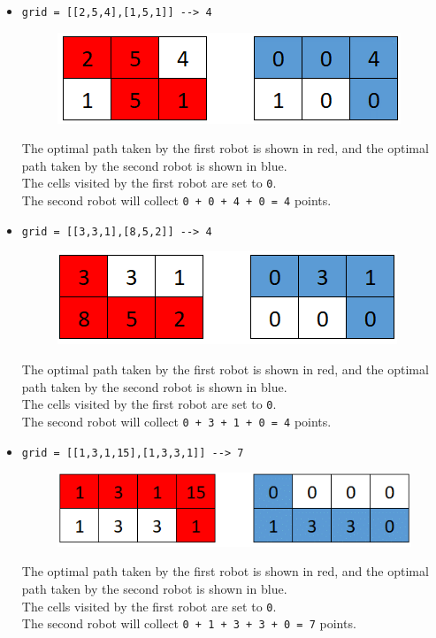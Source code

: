 \begin{itemize}
\item {\colorbox{CodeBackground}{\lstinline|grid = [[2,5,4],[1,5,1]] --> 4|}}
\begin{figure}[H]
\centering
\includegraphics[width=0.3\linewidth]{images/lc2017_eg1}
\end{figure}
The optimal path taken by the first robot is shown in red, and the optimal path taken by the second robot is shown in blue.\\
The cells visited by the first robot are set to {\colorbox{CodeBackground}{\lstinline|0|}}.\\
The second robot will collect {\colorbox{CodeBackground}{\lstinline|0 + 0 + 4 + 0 = 4|}} points.
\item {\colorbox{CodeBackground}{\lstinline|grid = [[3,3,1],[8,5,2]] --> 4|}}
\begin{figure}[H]
\centering
\includegraphics[width=0.3\linewidth]{images/lc2017_eg2}
\end{figure}
The optimal path taken by the first robot is shown in red, and the optimal path taken by the second robot is shown in blue.\\
The cells visited by the first robot are set to {\colorbox{CodeBackground}{\lstinline|0|}}.\\
The second robot will collect {\colorbox{CodeBackground}{\lstinline|0 + 3 + 1 + 0 = 4|}} points.
\item {\colorbox{CodeBackground}{\lstinline|grid = [[1,3,1,15],[1,3,3,1]] --> 7|}}
\begin{figure}[H]
\centering
\includegraphics[width=0.38\linewidth]{images/lc2017_eg3}
\end{figure}
The optimal path taken by the first robot is shown in red, and the optimal path taken by the second robot is shown in blue.\\
The cells visited by the first robot are set to {\colorbox{CodeBackground}{\lstinline|0|}}.\\
The second robot will collect {\colorbox{CodeBackground}{\lstinline|0 + 1 + 3 + 3 + 0 = 7|}} points.
\end{itemize}


